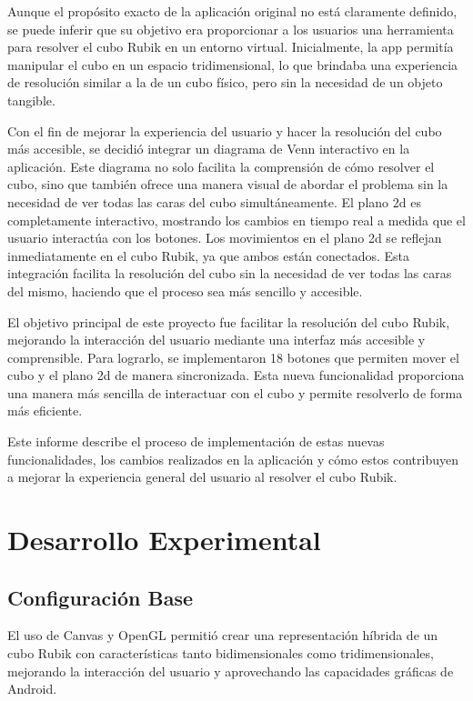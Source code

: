                                                                                                                                                                                                                                                                                                                                                                                                                                                                                                                                                                                                                                                                                                                                                                                                                                                                                                                                                                                                                                                                                                                                                                                                                                                                                                                                                                                                                                                                                                                                                                                                                                                                                                                                                                                                                                                                                                                                                                                                                                                                                                                                                                                                                                                                                                                                                                                                                                                                                                                                                                                                                                                                                                                                                                                                                                                                                                                                                                                                                                                                                                                                                                                                                                                                                                                                                                                                                                                                                                                                                                                                                                                                                                                                                                                                                                                                                                                                                                                                                                                                                                                                                                                                                                                                                                                                                                                                                                                                                                                                                                                                                                                                                                                                                                                                                                                                                                                                                                                                                                                                                                                                                                                                                                                                                                                                                                                                                                                                                                                                                                                                                                                                                                                                                                                                                                                                                                                                                                                                                                                                                                                                                                                                                                                                                                                                                                                                                                                                                                                                                                                                                                                                                                                                                                                                                                                                                                                                                                                                                                                                                                                                                                                                                                                                                                                                                                                                                                                                                                                                                                                                                                                                                                                                                                                                                                                                                                                                                                                                                                                                                                                                                                                                                                                                                                                                                                                                                                                                                                                                                                                                                                                                                                                                                                                                                                                                                                                                                                                                                                                                                                                                                                                                                                                                                                                                                                                                                                                                                                                                                                                                                                                                                                                                                                                                                                                                                                                                                                                                                                                                                                                                                                                                                                                                                                                                                                                                                                                                                                                                                                                                                                                                                                                                                                                                                                                                                                                                                                                                                                                                                                                                                                                                                                                                                                                                                                                                                                                                                                                                                                                                                                                                                                                                                                                                                                                                                                                                                                                                                                                                                                                                                                                                                                                                                                                                                                                                                                                                                                                                                                                                                                                                                                                                                                                                                                                                                                                                                                                                                                                                                                                                                                                                                                                                                                                                                                                                                                                                                                                                                                                                                                                                                                                                                                                                                                                                                                                                                                                                                                                                                                                                                                                                                                                                                                                                                                                                                                                                                                                                                                                                                                                                                                                                                                                                                                                                                                                                                                                                                                                                                                                                                                                                                                                                                                                                                                                                                                                                                                                                                                                                                                                                                                                                                                                                                                                                                                                                                                                                                                                                                                                                                                                                                                                                                                                                                                                                                                                                                                                                                                                                                                                                                                                                                                                                                                                                                                                                                                                                                                                                                                                                                                                                                                                                                                                                                                                                                                                                                                                                                                                                                                                                                                                                                                                                                                                                                                                                                                                                                                                                                                                                                                                                                                                                                                                                                                                                                                                                                                                                                                                                                                                                                                                                                                                                                                                                                                                                                                                                                                                                                                                                                                                                                                                                                                                                                                                                                                                                                                                                                                                                                                                                                                                                                                                                                                                                                                                                                                                                                                                                                                                                                                                                                                                                                                                                                                                                                                                                                                                                                                                                                                                                                                                                                                                                                                                                                                                                                                                                                                                                                                                                                                                                                                                                                                                                                                                                                                                                                                                                                                                                                                                                                                                                                                                                                                                                                                                                                                                                                                                                                                                                                                                                                                                                                                                                                                                                                                                                                                                                                                                                                                                                                                                                                                                                                                                                                                                                                                                                                                                                                                                                                                                                                                                                                                                                                                                                                                                                                                                                                                                                                                                                                                                                                                                                                                                                                                                                                                                                                                                                                                                                                                                                                                                                                                                                                                                                                                                                                                                                                                                                                                                                                                                                                                                                                                                                                                                                                                                                                                                                                                                                                                                                                                                                                                                                                                                                                                                                                                                                                                                                                                                                                                                                                                                                                                                                                                                                                                                                                                                                                                                                                                                                                                                                                                                                                                                                                                                                                                                                                                                                                                                                                                                                                                                                                                                                                                                                                                                                                                                                                                                                                                                                                                                                                                                                                                                                                                                                                                                                                                                                                                                                                                                                                                                                                                                                                                                                                                                                                                                                                                                                                                                                                                                                                                                                                                                                                                                                                                                                                                                                                                                                                                                                                                                                                                                                                                                                                                                                                                                                                                                                                                                                                                                                                                                                                                                                                                                                                                                                                                                                                                                                                                                                                                                                                                                                                                                                                                                                                                                                                                                                                                                                                                                                                                                                                                                                                                                                                                                                                                                                                                                                                                                                                                                                                                                                                                                                                                                                                                                                                                                                                                                                                                                                                                                                                                                                                                                                                                                                                                                                                                                                                                                                                                                                                                                                                                                                                                                                                                                                                                                                                                                                                                                                                                                                                                                                                                                                                                                                                                                                                                                                                                                                                                                                                                                                                                                                                                                                                                                                                                                                                                                                                                                                                                                                                                                                                                                                                                                                                                                                                                                                                                                                                                                                                                                                                                                                                                                                                                                                                                                                                                                                                                                                                                                                                                                                                                                                                                                                                                                                                                                                                                                                                                                                                                                                                                                                                                                                                                                                                                                                                                                                                                                                                                                                                                                                                                                                                                                                                                                                                                                                                                                                                                                                                                                                                                                                                                                                                                                                                                                                                                                                                                                                                                                                                                                                                                                                                                                                                                                                                                                                                                                                                                                                                                                                                                                                                                                                                                                                                                                                                                                                                                                                                                                                                                                                                                                                                                                                                                                                                                                                                                                                                                                                                                                                                                                                                                                                                                                                                                                                                                                                                                                                                                                                                                                                                                                                                                                                                                                                                                                                                                                                                                                                                                                                                                                                                                                                                                                                                                                                                                                                                                                                                                                                                                                                                                                                                                                                                                                                                                                                                                                                                                                                                                                                                                                                                                                                                                                                                                                                                                                                                                                                                                                                                                                                                                                                                                                                                                                                                                                                                                                                                                                                                                                                                                                                                                                                                                                                                                                                                                                                                                                                                                                                                                                                                                                                                                                                                                                                                                                                                                                                                                                                                                                                                                                                                                                                                                                                                                                                                                                                                                                                                                                                                                                                                                                                                                                                                                                                                                                                                                                                                                                                                                                                                                                                                                                                                                                                                                                                                                                                                                                                                                                                                                                                                                                                                                                                                                                                                                                                                                                                                                                                                                                                                                                                                                                                                                                                                                                                                                                                                                                                                                                                                                                                                                                                                                                                                                                                                                                                                                                                                                                                                                                                                                                                                                                                                                                                                                                                                                                                                                                                                                                                                                                                                                                                                                                                                                                                                                                                                                                                                                                                                                                                                                                                                                                                                                                                                                                                                                                                                                                                                                                                                                                                                                                                                                                                                                                                                                                                                                                                                                                                                                                                                                                                                                                \documentclass[conference]{IEEEtran}
\begin{document}
Aunque el propósito exacto de la aplicación original no está claramente definido, se puede inferir que su objetivo era proporcionar a los usuarios una herramienta para resolver el cubo Rubik en un entorno virtual\cite{androiddevelopers_drawables}. Inicialmente, la app permitía manipular el cubo en un espacio tridimensional, lo que brindaba una experiencia de resolución similar a la de un cubo físico, pero sin la necesidad de un objeto tangible.\cite{9gag_rubik}

Con el fin de mejorar la experiencia del usuario y hacer la resolución del cubo más accesible, se decidió integrar un diagrama de Venn interactivo en la aplicación. \cite{canela2019aspectos}Este diagrama no solo facilita la comprensión de cómo resolver el cubo, sino que también ofrece una manera visual de abordar el problema sin la necesidad de ver todas las caras del cubo simultáneamente.\cite{rodriguez2023ejemplos} El plano 2d es completamente interactivo, mostrando los cambios en tiempo real a medida que el usuario interactúa con los botones\cite{edrawsoft_venn}. Los movimientos en el plano 2d se reflejan inmediatamente en el cubo Rubik, ya que ambos están conectados.\cite{androiddevelopers_opengl} Esta integración facilita la resolución del cubo sin la necesidad de ver todas las caras del mismo, haciendo que el proceso sea más sencillo y accesible.\cite{spinelli2005diagrama}

El objetivo principal de este proyecto fue facilitar la resolución del cubo Rubik, mejorando la interacción del usuario mediante una interfaz más accesible y comprensible. Para lograrlo, se implementaron 18 botones que permiten mover el cubo y el plano 2d de manera sincronizada\cite{kessenich2006opengl}. Esta nueva funcionalidad proporciona una manera más sencilla de interactuar con el cubo y permite resolverlo de forma más eficiente.

Este informe describe el proceso de implementación de estas nuevas funcionalidades, los cambios realizados en la aplicación y cómo estos contribuyen a mejorar la experiencia general del usuario al resolver el cubo Rubik.\cite{soriano2019android}


\section{Desarrollo Experimental}

\subsection{Configuración Base} 
El uso de Canvas y OpenGL permitió crear una representación híbrida de un cubo Rubik con características tanto bidimensionales como tridimensionales, mejorando la interacción del usuario y aprovechando las capacidades gráficas de Android.
\end{document}
